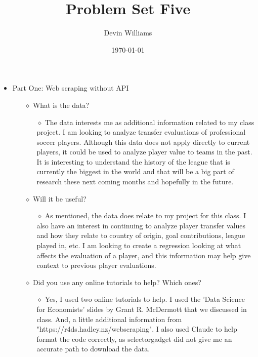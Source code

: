 \documentclass[12pt,letterpaper]{article}
\title{\textbf{Problem Set Five}}
\author{Devin Williams}
\date{\today}
\begin{document}
\maketitle

\begin{itemize}
    \item Part One: Web scraping without API
        \begin{itemize}
            \item[$\diamond$] What is the data?
                \begin{itemize}
                     \item[$\diamond$] The data interests me as additional information related to my class project. I am looking to analyze transfer evaluations of professional soccer players. Although this data does not apply directly to current players, it could be used to analyze player value to teams in the past. It is interesting to understand the history of the league that is currently the biggest in the world and that will be a big part of research these next coming months and hopefully in the future. 
                \end{itemize}
        \end{itemize}
        
        \begin{itemize}
    \item[$\diamond$] Will it be useful?
         \begin{itemize}
            \item[$\diamond$] As mentioned, the data does relate to my project for this class. I also have an interest in continuing to analyze player transfer values and how they relate to country of origin, goal contributions, league played in, etc. I am looking to create a regression looking at what affects the evaluation of a player, and this information may help give context to previous player evaluations. 
        \end{itemize}
        \end{itemize}
     \begin{itemize}
    \item[$\diamond$] Did you use any online tutorials to help? Which ones?
        \begin{itemize}
            \item[$\diamond$] Yes, I used two online tutorials to help. I used the 'Data Science for Economists' slides by Grant R. McDermott that we discussed in class. And, a little additional information from "https://r4ds.hadley.nz/webscraping". I also used Claude to help format the code correctly, as selectorgadget did not give me an accurate path to download the data. 
        \end{itemize}
      \end{itemize}
      

\end{itemize}
\end{document}

